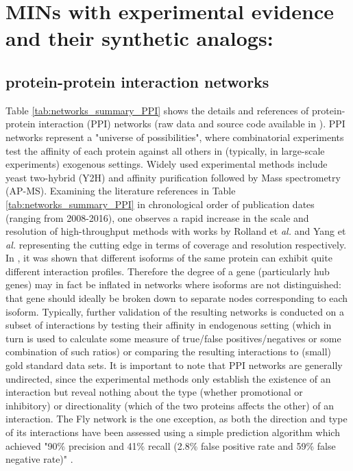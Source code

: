 

\newpage
\section{MINs with experimental evidence and their synthetic analogs: }\label{sup_realnets}
\subsection{protein-protein interaction networks}\label{sec:data_DB_nets}
    Table \ref{tab:networks_summary_PPI}  shows the details and references of protein-protein interaction (PPI) networks (raw data and source code available in  \cite{atiia_case-study_2017}).
    PPI networks represent a "universe of possibilities", where combinatorial experiments test the affinity of each protein against all others in (typically, in large-scale experiments) exogenous settings. Widely used experimental methods include yeast two-hybrid (Y2H) and affinity purification followed by Mass spectrometry (AP-MS). Examining the literature references in Table \ref{tab:networks_summary_PPI} in chronological order of publication dates (ranging from 2008-2016), one observes a rapid increase in the scale  and resolution  of high-throughput methods with works by Rolland et \textit{al.}  \cite{rolland_proteome-scale_2014} and Yang et \textit{al.}  \cite{yang_widespread_2016} representing the cutting edge in terms of coverage and resolution respectively.
    In  \cite{yang_widespread_2016}, it was shown that different isoforms of the same protein can exhibit quite different interaction profiles. Therefore the degree of a gene (particularly hub genes) may in fact be inflated in networks where isoforms are not distinguished: that gene should ideally be broken down to separate nodes corresponding to each isoform.
    Typically, further validation of the resulting networks is conducted on a subset of interactions by testing their affinity in endogenous setting (which in turn is used to calculate some measure of true/false positives/negatives or some combination of such ratios) or comparing the resulting interactions to (small) gold standard data sets. It is important to note that PPI networks are generally undirected, since the experimental methods only establish the existence of an interaction but reveal nothing about the type (whether promotional or inhibitory) or directionality (which of the two proteins affects the other) of an interaction. The Fly network is the one exception, as both the direction and type of its interactions have been assessed using a simple prediction algorithm which achieved "90\% precision and 41\% recall (2.8\% false positive rate and 59\% false negative rate)"  \cite{vinayagam_integrating_2014}.
